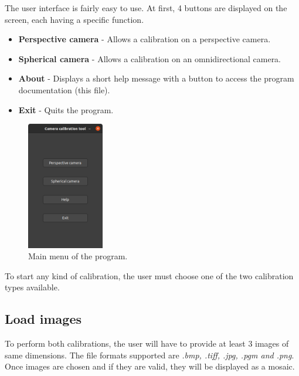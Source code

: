 \documentclass{article}
\begin{document}
The user interface is fairly easy to use. At first, 4 buttons are displayed on the screen, each having a specific function.

\begin{itemize}
    \item \textbf{Perspective camera} - Allows a calibration on a perspective camera.
     \item \textbf{Spherical camera} - Allows a calibration on an omnidirectional camera.
     \item \textbf{About} - Displays a short help message with a button to access the program documentation (this file).
     \item \textbf{Exit} - Quits the program.
\end{itemize}



\begin{figure}[H]
\centering
\includegraphics[width=0.3\textwidth]{main_menu.png}
\caption{\label{fig:main_menu}Main menu of the program.}
\end{figure}

To start any kind of calibration, the user must choose one of the two calibration types available.

\subsection{Load images}

To perform both calibrations, the user will have to provide at least 3 images of same dimensions. The file formats supported are \textit{.bmp, .tiff, .jpg, .pgm and .png}. Once images are chosen and if they are valid, they will be displayed as a mosaic.
\end{document}
